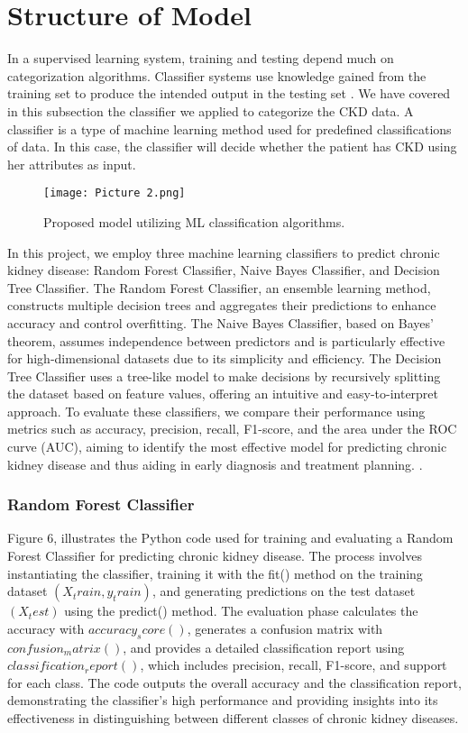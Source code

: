 \documentclass[conference]{IEEEtran}
\begin{document}
\section{Structure of Model }

In a supervised learning system, training and testing depend much on categorization algorithms. Classifier systems use knowledge gained from the training set to produce the intended output in the testing set\cite{8} \cite{9}. We have covered in this subsection the classifier we applied to categorize the CKD data. A classifier is a type of machine learning method used for predefined classifications of data. In this case, the classifier will decide whether the patient has CKD using her attributes as input. 

\begin{figure}
\centering
\texttt{[image: Picture 2.png]}
\caption{Proposed model utilizing ML classification algorithms.} 
\label{fig5}
\end{figure}
In this project, we employ three machine learning classifiers to predict chronic kidney disease: Random Forest Classifier, Naive Bayes Classifier, and Decision Tree Classifier. The Random Forest Classifier, an ensemble learning method, constructs multiple decision trees and aggregates their predictions to enhance accuracy and control overfitting. The Naive Bayes Classifier, based on Bayes' theorem, assumes independence between predictors and is particularly effective for high-dimensional datasets due to its simplicity and efficiency. The Decision Tree Classifier uses a tree-like model to make decisions by recursively splitting the dataset based on feature values, offering an intuitive and easy-to-interpret approach. To evaluate these classifiers, we compare their performance using metrics such as accuracy, precision, recall, F1-score, and the area under the ROC curve (AUC), aiming to identify the most effective model for predicting chronic kidney disease and thus aiding in early diagnosis and treatment planning. \cite{5}.

\subsubsection{Random Forest Classifier} 

Figure 6, illustrates the Python code used for training and evaluating a Random Forest Classifier for predicting chronic kidney disease. The process involves instantiating the classifier, training it with the fit() method on the training dataset \((X_train, y_train)\), and generating predictions on the test dataset \((X_test)\) using the predict() method. The evaluation phase calculates the accuracy with \(accuracy_score()\), generates a confusion matrix with \(confusion_matrix()\), and provides a detailed classification report using \(classification_report()\), which includes precision, recall, F1-score, and support for each class. The code outputs the overall accuracy and the classification report, demonstrating the classifier's high performance and providing insights into its effectiveness in distinguishing between different classes of chronic kidney diseases.
\end{document}

